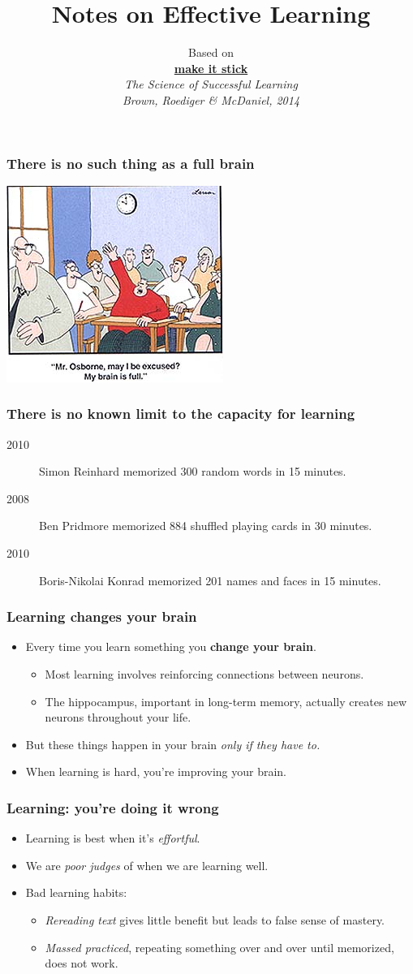 \documentclass{beamer}
\title{Notes on Effective Learning}
\author{Based on\\
\href{http://makeitstick.net/}{\bf make it stick}\\
\em The Science of Successful Learning
\\\small Brown, Roediger \& McDaniel, 2014}
\newcommand{\bi}{\begin{itemize}}
\newcommand{\li}{\item}
\newcommand{\ei}{\end{itemize}}
\newcommand{\bfr}[1]{\begin{frame}[fragile]\frametitle{{ #1 }}}
\begin{document}
\begin{frame}
\maketitle

\end{frame}



\bfr{There is no such thing as a full brain}
\begin{center}
\includegraphics[height=0.7\textheight]{brainisfull.jpg}
\end{center}
\end{frame}

\bfr{There is no known limit to the capacity for learning}
\begin{description}
\li[2010] Simon Reinhard memorized 300 random words in 15 minutes.
\li[2008] Ben Pridmore memorized 884 shuffled playing cards in 30 minutes. 
\li[2010] Boris-Nikolai Konrad memorized 201 names and faces in 15 minutes.
\end{description}

\end{frame}

\bfr{Learning changes your brain}
\bi
\li Every time you learn something you {\bf change your brain}.
\bi
\li Most learning involves reinforcing connections between neurons.
\li The hippocampus, important in
long-term memory, actually creates new neurons throughout your life.
\ei
\li But these things happen in your brain {\em only if they have to.}
\li When learning is hard, you're improving your brain.
\ei
\end{frame}

\bfr{Learning: you're doing it wrong}
\bi
\li Learning is best when it's {\em effortful}.
\li We are {\em poor judges} of when we are learning well.
\li Bad learning habits:
\bi
\li {\em Rereading text} gives little benefit
but leads to false sense of mastery.
\li {\em Massed practiced}, repeating something over and over
until memorized, does not work.
\ei
\ei
\end{frame}
\end{document}
